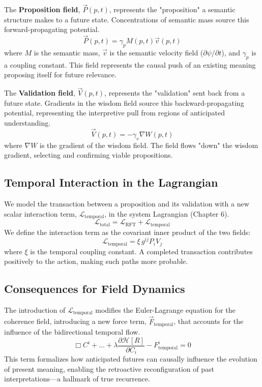 The \textbf{Proposition field}, \(\vec{P}(p,t)\), represents the "proposition" a semantic structure makes to a future state. Concentrations of semantic mass source this forward-propagating potential.
\begin{equation}
\vec{P}(p,t) = \gamma_p M(p,t) \vec{v}(p,t)
\end{equation}
where \(M\) is the semantic mass, \(\vec{v}\) is the semantic velocity field (\(\partial\psi/\partial t\)), and \(\gamma_p\) is a coupling constant. This field represents the causal push of an existing meaning proposing itself for future relevance.

The \textbf{Validation field}, \(\vec{V}(p,t)\), represents the "validation" sent back from a future state. Gradients in the wisdom field source this backward-propagating potential, representing the interpretive pull from regions of anticipated understanding.
\begin{equation}
\vec{V}(p,t) = -\gamma_v \nabla W(p,t)
\end{equation}
where \(\nabla W\) is the gradient of the wisdom field. The field flows "down" the wisdom gradient, selecting and confirming viable propositions.

\subsection{Temporal Interaction in the Lagrangian}
We model the transaction between a proposition and its validation with a new scalar interaction term, \(\mathcal{L}_{\text{temporal}}\), in the system Lagrangian (Chapter 6).
\begin{equation}
\mathcal{L}_{\text{total}} = \mathcal{L}_{\text{RFT}} + \mathcal{L}_{\text{temporal}}
\end{equation}
We define the interaction term as the covariant inner product of the two fields:
\begin{equation}
\mathcal{L}_{\text{temporal}} = \xi \, g^{ij} P_{i} V_{j}
\end{equation}
where \(\xi\) is the temporal coupling constant. A completed transaction contributes positively to the action, making such paths more probable.

\subsection{Consequences for Field Dynamics}
The introduction of \(\mathcal{L}_{\text{temporal}}\) modifies the Euler-Lagrange equation for the coherence field, introducing a new force term, \(\vec{F}_{\text{temporal}}\), that accounts for the influence of the bidirectional temporal flow.
\begin{equation}
\Box C^i + \dots + \lambda \frac{\partial \mathcal{H}[R]}{\partial C_i} - F^i_{\text{temporal}} = 0
\end{equation}
This term formalizes how anticipated futures can causally influence the evolution of present meaning, enabling the retroactive reconfiguration of past interpretations—a hallmark of true recurrence. 
